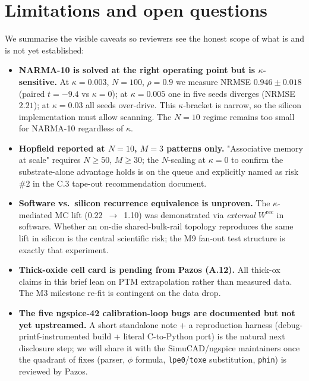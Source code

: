 \documentclass[fontsize=10pt]{article}
\begin{document}
\section{Limitations and open questions}
We summarise the visible caveats so reviewers see the honest scope of what is
and is not yet established:
\begin{itemize}\setlength{\itemsep}{1pt}
  \item \textbf{NARMA-10 is solved at the right operating point but is
    $\kappa$-sensitive.} At $\kappa=0.003$, $N=100$, $\rho=0.9$ we measure
    NRMSE $0.946 \pm 0.018$ (paired $t=-9.4$ vs $\kappa=0$); at $\kappa=0.005$
    one in five seeds diverges (NRMSE $2.21$); at $\kappa=0.03$ all seeds
    over-drive. This $\kappa$-bracket is narrow, so the silicon implementation
    must allow scanning. The $N=10$ regime remains too small for NARMA-10
    regardless of $\kappa$.
  \item \textbf{Hopfield reported at $N=10$, $M=3$ patterns only.}
    "Associative memory at scale" requires $N{\geq}50$, $M{\geq}30$; the
    $N$-scaling at $\kappa=0$ to confirm the substrate-alone advantage holds
    is on the queue and explicitly named as risk \#2 in the C.3 tape-out
    recommendation document.
  \item \textbf{Software vs.\ silicon recurrence equivalence is unproven.}
    The $\kappa$-mediated MC lift (0.22~$\to$~1.10) was demonstrated via
    \emph{external} $W^{\mathrm{rec}}$ in software. Whether an on-die
    shared-bulk-rail topology reproduces the same lift in silicon is the
    central scientific risk; the M9 fan-out test structure is exactly that
    experiment.
  \item \textbf{Thick-oxide cell card is pending from Pazos (A.12).}
    All thick-ox claims in this brief lean on PTM extrapolation rather than
    measured data. The M3 milestone re-fit is contingent on the data drop.
  \item \textbf{The five ngspice-42 calibration-loop bugs are documented but
    not yet upstreamed.} A short standalone note + a reproduction harness
    (debug-printf-instrumented build + literal C-to-Python port) is the
    natural next disclosure step; we will share it with the SimuCAD/ngspice
    maintainers once the quadrant of fixes (parser, $\phi$ formula,
    \texttt{lpe0}/\texttt{toxe} substitution, \texttt{phin}) is reviewed by
    Pazos.
\end{itemize}
\end{document}
